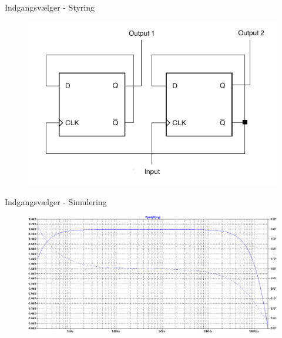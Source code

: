 \begin{frame}{Indgangsvælger - Styring}

\begin{figure}[h]
\centering
\includegraphics[scale=0.4]{../rapport/teknisk/indgangsvaelger/flipflop.png}
\label{fig:indgangsvaelger-flipflop}
\end{figure}
\end{frame}

\begin{frame}{Indgangsvælger - Simulering}
\begin{figure}[h]
\centering
\includegraphics[width=\textwidth]{../rapport/teknisk/indgangsvaelger/simulering/frekvenskarakteristik.png}
\label{indgangsvaelger_frekvenskarakteristik}
\end{figure}
\end{frame}

